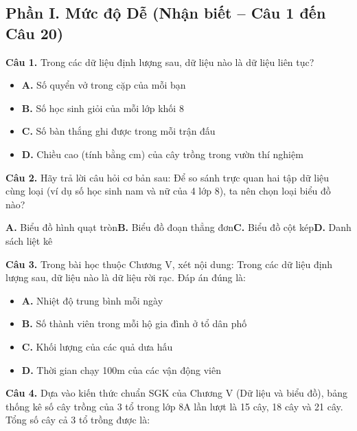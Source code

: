 \documentclass[11pt,a4paper]{article}
\begin{document}
\subsection*{\color{accent} Phần I. Mức độ Dễ (Nhận biết -- Câu 1 đến Câu 20)}
\textbf{\color{primary} Câu 1.} Trong các dữ liệu định lượng sau, dữ liệu nào là dữ liệu liên tục?\par
\begin{itemize}\setlength{\itemsep}{1pt}\setlength{\parskip}{0pt}
  \item[] \textbf{A.} Số quyển vở trong cặp của mỗi bạn
  \item[] \textbf{B.} Số học sinh giỏi của mỗi lớp khối 8
  \item[] \textbf{C.} Số bàn thắng ghi được trong mỗi trận đấu
  \item[] \textbf{D.} Chiều cao (tính bằng cm) của cây trồng trong vườn thí nghiệm
\end{itemize}\vspace{2pt}
\textbf{\color{primary} Câu 2.} Hãy trả lời câu hỏi cơ bản sau: Để so sánh trực quan hai tập dữ liệu cùng loại (ví dụ số học sinh nam và nữ của 4 lớp 8), ta nên chọn loại biểu đồ nào?\par
\hspace*{1.5em}\textbf{A.} Biểu đồ hình quạt tròn\quad\quad \textbf{B.} Biểu đồ đoạn thẳng đơn\quad\quad \textbf{C.} Biểu đồ cột kép\quad\quad \textbf{D.} Danh sách liệt kê\par\vspace{2pt}
\textbf{\color{primary} Câu 3.} Trong bài học thuộc Chương V, xét nội dung: Trong các dữ liệu định lượng sau, dữ liệu nào là dữ liệu rời rạc. Đáp án đúng là:\par
\begin{itemize}\setlength{\itemsep}{1pt}\setlength{\parskip}{0pt}
  \item[] \textbf{A.} Nhiệt độ trung bình mỗi ngày
  \item[] \textbf{B.} Số thành viên trong mỗi hộ gia đình ở tổ dân phố
  \item[] \textbf{C.} Khối lượng của các quả dưa hấu
  \item[] \textbf{D.} Thời gian chạy 100m của các vận động viên
\end{itemize}\vspace{2pt}
\textbf{\color{primary} Câu 4.} Dựa vào kiến thức chuẩn SGK của Chương V (Dữ liệu và biểu đồ), bảng thống kê số cây trồng của 3 tổ trong lớp 8A lần lượt là 15 cây, 18 cây và 21 cây. Tổng số cây cả 3 tổ trồng được là:\par
\end{document}
